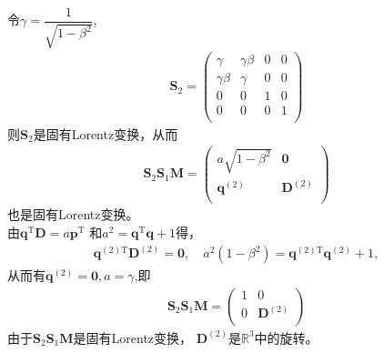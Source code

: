 \begin{enumerate}
    令$\gamma = \dfrac{1}{\sqrt{1-\beta^2}}$,
    \begin{align*}
        \boldsymbol{S}_2=
        \begin{pmatrix}
            \gamma & \gamma \beta & 0 & 0\\
            \gamma \beta & \gamma & 0 & 0\\
            0 & 0 & 1 & 0\\
            0 & 0 & 0 & 1\\
        \end{pmatrix}
    \end{align*}
    则$\boldsymbol{S}_2$是固有Lorentz变换，从而
    \begin{align*}
        \boldsymbol{S}_2\boldsymbol{S}_1\boldsymbol{M}=
        \begin{pmatrix}
            a\sqrt{1-\beta^2} & \boldsymbol{0}\\
            \boldsymbol{q}^{(2)} & \boldsymbol{D}^{(2)}\\
        \end{pmatrix}
    \end{align*}
    也是固有Lorentz变换。\\
    由$\boldsymbol{q}^{\text{T}}\boldsymbol{D}=a\boldsymbol{p}^{\text{T}}$
    和$a^2=\boldsymbol{q}^{\text{T}}\boldsymbol{q}+1$得，
    \begin{align*}
        \boldsymbol{q}^{(2)\text{T}}\boldsymbol{D}^{(2)}=\boldsymbol{0},\quad
        a^2(1-\beta^2)=\boldsymbol{q}^{(2)\text{T}}\boldsymbol{q}^{(2)}+1,
    \end{align*}
    从而有$\boldsymbol{q}^{(2)}=\boldsymbol{0},a=\gamma$,即
    \begin{align*}
        \boldsymbol{S}_2\boldsymbol{S}_1\boldsymbol{M}=
        \begin{pmatrix}
            1 & 0\\
            0 & \boldsymbol{D}^{(2)}\\
        \end{pmatrix}
    \end{align*}
    由于$\boldsymbol{S}_2\boldsymbol{S}_1\boldsymbol{M}$是固有Lorentz变换，
    $\boldsymbol{D}^{(2)}$是$\mathbb{R}^3$中的旋转。


\end{enumerate}
